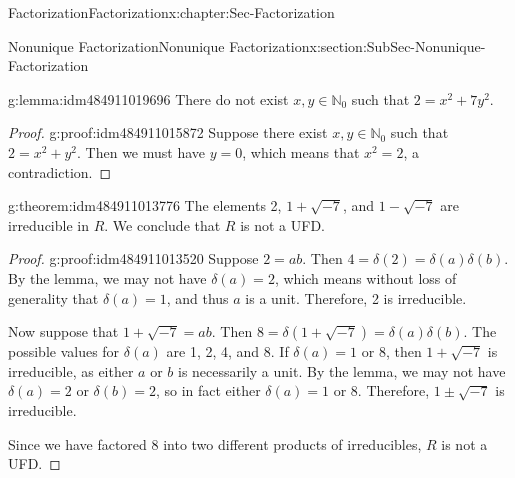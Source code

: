 \documentclass[oneside,10pt,]{book}
\numberwithin{equation}{section}
\def\N{{\mathbb N}}
\begin{document}
\begin{chapterptx}{Factorization}{}{Factorization}{}{}{x:chapter:Sec-Factorization}
\begin{sectionptx}{Nonunique Factorization}{}{Nonunique Factorization}{}{}{x:section:SubSec-Nonunique-Factorization}
\begin{lemma}{}{}{g:lemma:idm484911019696}
There do not exist \(x,y\in \N_0\) such that \(2 = x^2 + 7y^2\).%
\end{lemma}
\begin{proof}{}{g:proof:idm484911015872}
Suppose there exist \(x,y\in \N_0\) such that \(2 = x^2 + y^2\). Then we must have \(y = 0\), which means that \(x^2 = 2\), a contradiction.%
\end{proof}
\begin{theorem}{}{}{g:theorem:idm484911013776}%
The elements 2, \(1+ \sqrt{-7}\), and \(1-\sqrt{-7}\) are irreducible in \(R\). We conclude that \(R\) is not a UFD.%
\end{theorem}
\begin{proof}{}{g:proof:idm484911013520}
Suppose \(2 = ab\). Then \(4 = \delta(2) = \delta(a)\delta(b)\). By the lemma, we may not have \(\delta(a) = 2\), which means without loss of generality that \(\delta(a) = 1\), and thus \(a\) is a unit. Therefore, 2 is irreducible.%
\par
Now suppose that \(1 + \sqrt{-7} = ab\). Then \(8 = \delta(1+\sqrt{-7}) = \delta(a) \delta(b)\). The possible values for \(\delta(a)\) are 1, 2, 4, and 8. If \(\delta(a) = 1\) or 8, then \(1+\sqrt{-7}\) is irreducible, as either \(a\) or \(b\) is necessarily a unit. By the lemma, we may not have \(\delta(a) = 2\) or \(\delta(b) = 2\), so in fact either \(\delta(a) = 1\) or 8. Therefore, \(1\pm \sqrt{-7}\) is irreducible.%
\par
Since we have factored 8 into two different products of irreducibles, \(R\) is not a UFD.%
\end{proof}
\end{sectionptx}
\end{chapterptx}
%
%
\typeout{************************************************}
\typeout{************************************************}
%
\end{document}
